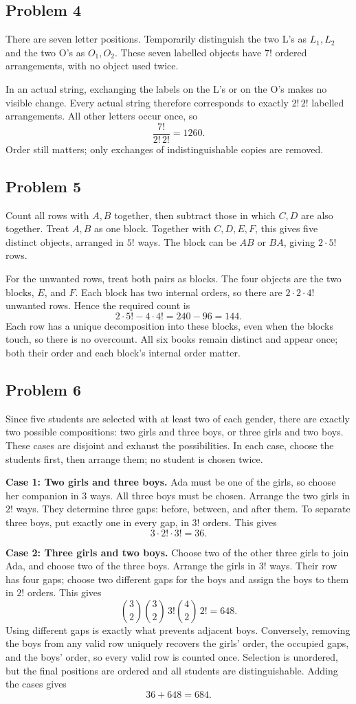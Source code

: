 \documentclass[12pt]{article}
\newcommand{\solution}[1]{\par\Needspace{8\baselineskip}\subsection*{Problem #1}}
\begin{document}
\solution{4}
There are seven letter positions. Temporarily distinguish the two L's
as $L_1,L_2$ and the two O's as $O_1,O_2$. These seven labelled objects
have $7!$ ordered arrangements, with no object used twice.

In an actual string, exchanging the labels on the L's or on the O's
makes no visible change. Every actual string therefore corresponds to
exactly $2!\,2!$ labelled arrangements. All other letters occur once, so
\[
\frac{7!}{2!\,2!}=\boxed{1260}.
\]
Order still matters; only exchanges of indistinguishable copies are removed.

\clearpage
\solution{5}
Count all rows with $A,B$ together, then subtract those in which $C,D$
are also together. Treat $A,B$ as one block. Together with $C,D,E,F$,
this gives five distinct objects, arranged in $5!$ ways. The block can
be $AB$ or $BA$, giving $2\cdot5!$ rows.

For the unwanted rows, treat both pairs as blocks. The four objects
are the two blocks, $E$, and $F$. Each block has two internal orders,
so there are $2\cdot2\cdot4!$ unwanted rows. Hence the required count is
\[
2\cdot5!-4\cdot4!=240-96=\boxed{144}.
\]
Each row has a unique decomposition into these blocks, even when the
blocks touch, so there is no overcount. All six books remain distinct
and appear once; both their order and each block's internal order matter.

\solution{6}
Since five students are selected with at least two of each gender, there
are exactly two possible compositions: two girls and three boys, or
three girls and two boys. These cases are disjoint and exhaust the possibilities.
In each case, choose the students first, then arrange them; no student
is chosen twice.

\textbf{Case 1: Two girls and three boys.}
Ada must be one of the girls, so choose her companion in $3$ ways.
All three boys must be chosen. Arrange the two girls in $2!$ ways.
They determine three gaps: before, between, and after them. To separate
three boys, put exactly one in every gap, in $3!$ orders. This gives
\[
3\cdot2!\cdot3!=36.
\]

\textbf{Case 2: Three girls and two boys.}
Choose two of the other three girls to join Ada, and choose two of the
three boys. Arrange the girls in $3!$ ways. Their row has four gaps;
choose two different gaps for the boys and assign the boys to them
in $2!$ orders. This gives
\[
\binom32\binom32\,3!\binom42\,2!=648.
\]
Using different gaps is exactly what prevents adjacent boys. Conversely,
removing the boys from any valid row uniquely recovers the girls' order,
the occupied gaps, and the boys' order, so every valid row is counted once.
Selection is unordered, but the final positions are ordered and all
students are distinguishable. Adding the cases gives
\[
36+648=\boxed{684}.
\]
\end{document}
